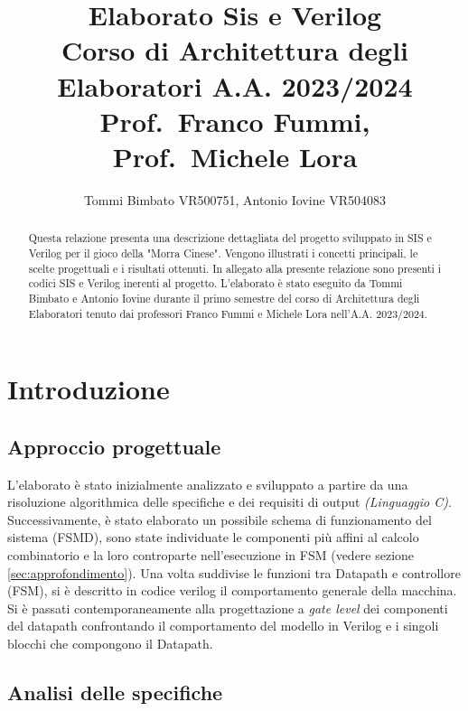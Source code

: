 \documentclass[a4paper]{report}
\author{Tommi Bimbato VR500751, Antonio Iovine VR504083}
\title{Elaborato Sis e Verilog \\ \normalsize Corso di Architettura degli Elaboratori A.A. 2023/2024 \\ Prof.\ Franco Fummi, Prof.\ Michele Lora}
\begin{document}
\begin{titlepage}
    \maketitle
\end{titlepage}

\thispagestyle{empty} %

\tableofcontents %

\begin{abstract}
Questa relazione presenta una descrizione dettagliata del progetto sviluppato in SIS e Verilog per il gioco della "Morra Cinese". Vengono illustrati i concetti principali, le scelte progettuali e i risultati ottenuti.
In allegato alla presente relazione sono presenti i codici SIS e Verilog inerenti al progetto.
L'elaborato è stato eseguito da Tommi Bimbato e Antonio Iovine durante il primo semestre del corso di Architettura degli Elaboratori tenuto dai professori Franco Fummi e Michele Lora nell'A.A. 2023/2024.

\end{abstract}

\chapter{Introduzione}
\section{Approccio progettuale}
L'elaborato è stato inizialmente analizzato e sviluppato a partire da una risoluzione algorithmica delle specifiche e dei requisiti di output \textit{(Linguaggio C)}.
Successivamente, è stato elaborato un possibile schema di funzionamento del sistema (FSMD), sono state individuate le componenti più affini al calcolo combinatorio e la loro controparte nell'esecuzione in FSM (vedere sezione \ref{sec:approfondimento}).\@
Una volta suddivise le funzioni tra Datapath e controllore (FSM), si è descritto in codice verilog il comportamento generale della macchina.
Si è passati contemporaneamente alla progettazione a \textit{gate level} dei componenti del datapath confrontando il comportamento del modello in Verilog e i singoli blocchi che compongono il Datapath.\@

\section{Analisi delle specifiche}
\end{document}
